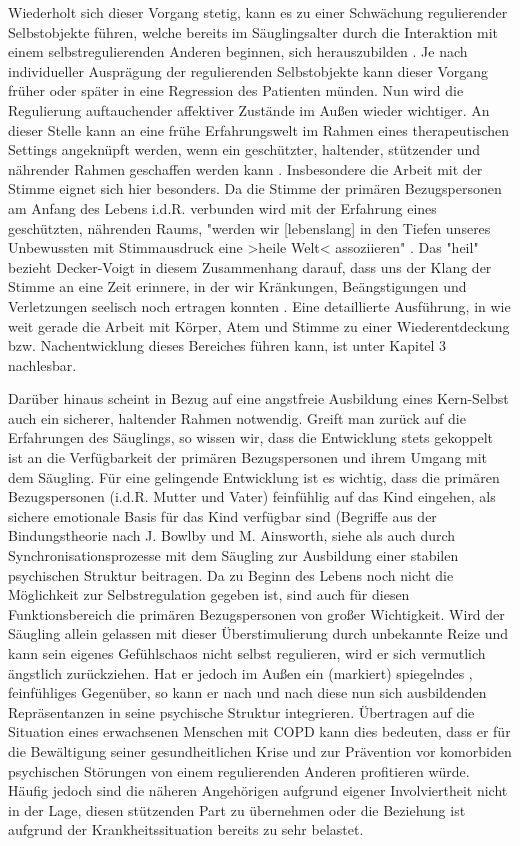 Wiederholt sich dieser Vorgang stetig, kann es zu einer Schwächung regulierender Selbstobjekte führen, welche bereits im Säuglingsalter durch die Interaktion mit einem selbstregulierenden Anderen beginnen, sich herauszubilden \autocite[vgl.][338f.]{stern2007}. Je nach individueller Ausprägung der regulierenden Selbstobjekte kann dieser Vorgang früher oder später in eine Regression des Patienten münden. Nun wird die Regulierung auftauchender affektiver Zustände im Außen wieder wichtiger. 
An dieser Stelle kann an eine frühe Erfahrungswelt im Rahmen eines therapeutischen Settings angeknüpft werden, wenn ein geschützter, haltender, stützender und nährender Rahmen geschaffen werden kann \autocite[vgl.][8ff.]{decker-voigt2008}. Insbesondere die Arbeit mit der Stimme eignet sich hier besonders. Da die Stimme der primären Bezugspersonen am Anfang des Lebens i.d.R. verbunden wird mit der Erfahrung eines geschützten, nährenden Raums, "werden wir [lebenslang] in den Tiefen unseres Unbewussten mit Stimmausdruck eine >heile Welt< assoziieren" \autocite[282]{deckervoigt2000}. Das "heil" bezieht Decker-Voigt in diesem Zusammenhang darauf, dass uns der Klang der Stimme an eine Zeit erinnere, in der wir Kränkungen, Beängstigungen und Verletzungen seelisch noch ertragen konnten \autocite{deckervoigt2000}. Eine detaillierte Ausführung, in wie weit gerade die Arbeit mit Körper, Atem und Stimme zu einer Wiederentdeckung bzw. Nachentwicklung dieses Bereiches führen kann, ist unter Kapitel 3 nachlesbar.

Darüber hinaus scheint in Bezug auf eine angstfreie Ausbildung eines Kern-Selbst auch ein sicherer, haltender Rahmen notwendig. Greift man zurück auf die Erfahrungen des Säuglings, so wissen wir, dass die Entwicklung stets gekoppelt ist an die Verfügbarkeit der primären Bezugspersonen und ihrem Umgang mit dem Säugling. Für eine gelingende Entwicklung ist es wichtig, dass die primären Bezugspersonen (i.d.R. Mutter und Vater) feinfühlig auf das Kind eingehen, als sichere emotionale Basis für das Kind verfügbar sind (Begriffe aus der Bindungstheorie nach J. Bowlby und M. Ainsworth, siehe \cite{brisch2013} als auch durch Synchronisationsprozesse mit dem Säugling zur Ausbildung einer stabilen psychischen Struktur beitragen. Da zu Beginn des Lebens noch nicht die Möglichkeit zur Selbstregulation gegeben ist, sind auch für diesen Funktionsbereich die primären Bezugspersonen von großer Wichtigkeit. Wird der Säugling allein gelassen mit dieser Überstimulierung durch unbekannte Reize und kann sein eigenes Gefühlschaos nicht selbst regulieren, wird er sich vermutlich ängstlich zurückziehen. Hat er jedoch im Außen ein (markiert) spiegelndes \autocite[vgl.][153]{fonagy2004}, feinfühliges Gegenüber, so kann er nach und nach diese nun sich ausbildenden Repräsentanzen in seine psychische Struktur integrieren. 
Übertragen auf die Situation eines erwachsenen Menschen mit COPD kann dies bedeuten, dass er für die Bewältigung seiner gesundheitlichen Krise und zur Prävention vor komorbiden psychischen Störungen von einem regulierenden Anderen profitieren würde. Häufig jedoch sind die näheren Angehörigen aufgrund eigener Involviertheit nicht in der Lage, diesen stützenden Part zu übernehmen oder die Beziehung ist aufgrund der Krankheitssituation bereits zu sehr belastet. 

